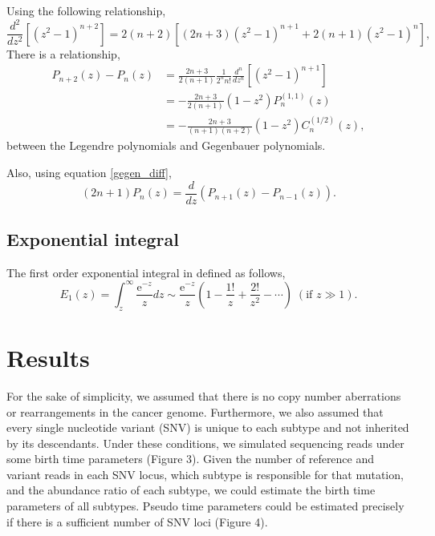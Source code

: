 \documentclass[12pt]{article}
\newcommand{\napier}{\mathrm{e}}
\newcommand{\bibun}[2]{\frac{d {#1}}{d {#2}}}
\begin{document}

Using the following relationship,
\begin{equation}
 \frac{d^2}{dz^2}\left[ (z^2 - 1)^{n+2} \right] = 2(n+2)\left[ (2n+3) (z^2 - 1)^{n+1} + 2(n+1) (z^2 - 1)^n \right],
\end{equation}
There is a relationship,
\begin{align}
 P_{n+2}(z) - P_n(z) & = \frac{2n+3}{2(n+1)} \frac{1}{2^n n!} \frac{d^n}{dz^n}\left[ (z^2 - 1)^{n+1} \right]\\
 & = -\frac{2n+3}{2(n+1)} (1-z^2) P^{(1,1)}_n(z)\\
 & = -\frac{2n+3}{(n+1)(n+2)} (1-z^2) C^{(1/2)}_n(z),
\end{align}
between the Legendre polynomials and Gegenbauer polynomials.

Also, using equation \eqref{gegen_diff},
\begin{equation}
 (2n+1)P_n(z) = \bibun{}{z} \left( P_{n+1} (z) - P_{n-1} (z) \right).\label{legendre_diff}
\end{equation}

\subsection{Exponential integral}
The first order exponential integral in defined as follows,
\begin{equation}
 E_1(z) = \int_{z}^{\infty} \frac{\napier^{-z}}{z} dz \sim \frac{\napier^{-z}}{z} \left( 1 - \frac{1!}{z} + \frac{2!}{z^2} - \cdots \right) \; (\text{if } z \gg 1 ).
\end{equation}

\section{Results}
For the sake of simplicity, we assumed that there is no copy number aberrations or rearrangements in the cancer genome. Furthermore, we also assumed that every single nucleotide variant (SNV) is unique to each subtype and not inherited by its descendants. Under these conditions, we simulated sequencing reads under some birth time parameters (Figure 3). Given the number of reference and variant reads in each SNV locus, which subtype is responsible for that mutation, and the abundance ratio of each subtype, we could estimate the birth time parameters of all subtypes. Pseudo time parameters could be estimated precisely if there is a sufficient number of SNV loci (Figure 4).
\end{document}
